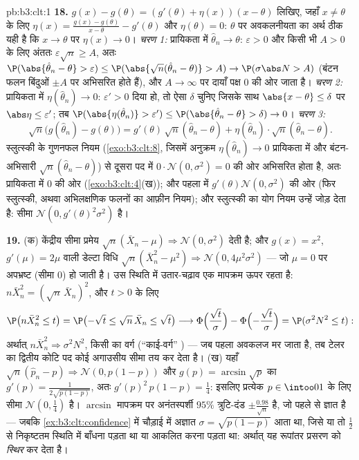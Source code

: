 \begin{solution}{pb:b3:clt:1}
\textbf{18.} $g(x) - g(\theta) = (g'(\theta) +
\eta(x))(x - \theta)$ लिखिए, जहाँ $x \neq \theta$ के लिए
$\eta(x) = \frac{g(x) - g(\theta)}{x - \theta} - g'(\theta)$
और $\eta(\theta) = 0$: $\theta$ पर अवकलनीयता का अर्थ ठीक
यही है कि $x \to \theta$ पर $\eta(x) \to 0$।
\emph{चरण 1:} प्रायिकता में $\hat\theta_n \to \theta$:
$\varepsilon > 0$ और किसी भी $A > 0$ के लिए अंततः
$\varepsilon\sqrt n \geq A$, अतः $\P(\abs{\hat\theta_n -
\theta} > \varepsilon) \leq \P(\abs{\sqrt
n(\hat\theta_n - \theta)} > A) \to \P(\sigma\abs N > A)$
(बंटन फलन  बिंदुओं $\pm A$ पर अभिसरित होते हैं), और
$A \to \infty$ पर दायाँ पक्ष $0$ की ओर जाता है।
\emph{चरण 2:} प्रायिकता में $\eta(\hat\theta_n) \to 0$:
$\varepsilon' > 0$ दिया हो, तो ऐसा $\delta$ चुनिए जिसके साथ
$\abs{x - \theta} \leq \delta$ पर $\abs\eta \leq
\varepsilon'$; तब $\P(\abs{\eta(\hat\theta_n)} >
\varepsilon') \leq \P(\abs{\hat\theta_n - \theta} > \delta)
\to 0$। \emph{चरण 3:}
\[
\sqrt n\bigl(g(\hat\theta_n) - g(\theta)\bigr) =
g'(\theta)\,\sqrt n(\hat\theta_n - \theta) +
\eta(\hat\theta_n)\cdot\sqrt n(\hat\theta_n - \theta) .
\]
स्लुत्स्की के गुणनफल नियम (\cref{exo:b3:clt:8}, जिसमें
अनुक्रम $\eta(\hat\theta_n) \to 0$ प्रायिकता में और
बंटन-अभिसारी $\sqrt n(\hat\theta_n - \theta)$) से दूसरा पद
 में $0\cdot\mathcal N(0,
\sigma^2) = 0$ की ओर अभिसरित होता है, अतः प्रायिकता में $0$
की ओर (\cref{exo:b3:clt:4}(ख)); और पहला  में
$g'(\theta)\mathcal N(0, \sigma^2)$ की ओर (फिर स्लुत्स्की,
अथवा अभिलक्षणिक फलनों का आफ़ीन नियम); और स्लुत्स्की का योग
नियम उन्हें जोड़ देता है: सीमा $\mathcal N(0,
g'(\theta)^2\sigma^2)$ है।

\textbf{19.} (क) केंद्रीय सीमा प्रमेय $\sqrt n(\bar X_n -
\mu) \Rightarrow \mathcal N(0, \sigma^2)$ देती है; और $g(x)
= x^2$, $g'(\mu) = 2\mu$ वाली डेल्टा विधि $\sqrt n(\bar
X_n^2 - \mu^2) \Rightarrow \mathcal N(0, 4\mu^2\sigma^2)$
--- जो $\mu = 0$ पर अपभ्रष्ट (सीमा $0$) हो जाती है। उस
स्थिति में उतार-चढ़ाव एक मापक्रम ऊपर रहता है: $n\bar X_n^2 =
(\sqrt n\,\bar X_n)^2$, और $t > 0$ के लिए
\[
\P\bigl(n\bar X_n^2 \leq t\bigr) = \P\bigl(-\sqrt t \leq
\sqrt n\,\bar X_n \leq \sqrt t\bigr) \longrightarrow
\Phi\Bigl(\frac{\sqrt t}\sigma\Bigr) -
\Phi\Bigl(-\frac{\sqrt t}\sigma\Bigr) = \P(\sigma^2N^2
\leq t) :
\]
अर्थात् $n\bar X_n^2 \Rightarrow \sigma^2N^2$, किसी 
का वर्ग (``काई-वर्ग'' ) --- जब पहला अवकलज मर जाता
है, तब टेलर का द्वितीय कोटि पद कोई अगाउसीय सीमा तय कर देता
है। (ख) यहाँ $\sqrt n(\hat p_n - p)
\Rightarrow \mathcal N(0, p(1 - p))$ और $g(p) =
\arcsin\sqrt p$ का $g'(p) = \frac1{2\sqrt{p(1 - p)}}$, अतः
$g'(p)^2\,p(1 - p) = \frac14$: इसलिए प्रत्येक $p \in
\intoo01$ के लिए सीमा $\mathcal N(0, \frac14)$ है।
$\arcsin$ मापक्रम पर अनंतस्पर्शी $95\%$ त्रुटि-दंड $\pm
\frac{0.98}{\sqrt n}$ है, जो पहले से ज्ञात है --- जबकि
\cref{ex:b3:clt:confidence} में चौड़ाई में अज्ञात
$\sigma = \sqrt{p(1-p)}$ आता था, जिसे या तो $\frac12$ से
निकृष्टतम स्थिति में बाँधना पड़ता था या आकलित करना पड़ता था:
अर्थात् यह रूपांतर प्रसरण को \emph{स्थिर} कर देता है।


\end{solution}
